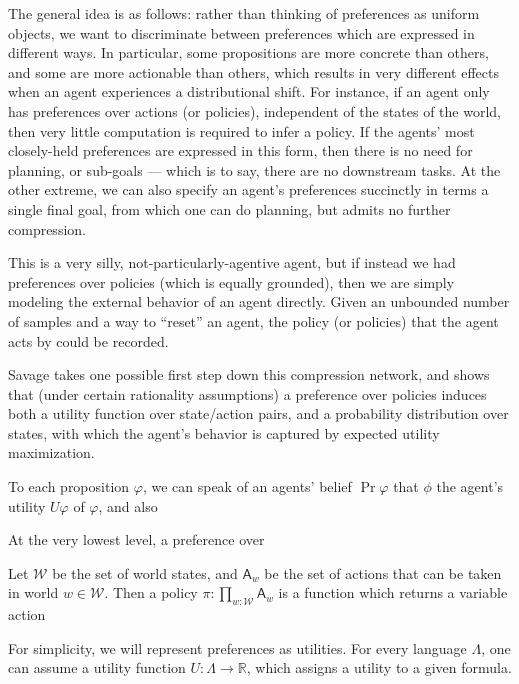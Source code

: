 \documentclass{book}
\begin{document}
	The general idea is as follows: rather than thinking of preferences as uniform objects, we want to discriminate between preferences which are expressed in different ways. In particular, some propositions are more concrete than others, and some are more actionable than others, which results in very different effects when an agent experiences a distributional shift. For instance, if an agent only has preferences over actions (or policies), independent of the states of the world, then very little computation is required to infer a policy. If the agents' most closely-held preferences are expressed in this form, then there is no need for planning, or sub-goals --- which is to say, there are no downstream tasks. At the other extreme, we can also specify an agent's preferences succinctly in terms a single final goal, from which one can do planning, but admits no further compression.
	
	
	
	This is a very silly, not-particularly-agentive agent, but if instead we had preferences over policies (which is equally grounded), then we are simply modeling the external behavior of an agent directly. Given an unbounded number of samples and a way to ``reset'' an agent, the policy (or policies) that the agent acts by could be recorded. 
	
	Savage takes one possible first step down this compression network, and shows that (under certain rationality assumptions) a preference over policies induces both a utility function over state/action pairs, and a probability distribution over states, with which the agent's behavior is captured by expected utility maximization.
	
	
	
	To each proposition $\varphi$, we can speak of an agents' belief $\Pr\varphi$ that $\phi$ the agent's utility $U \varphi$ of $\varphi$, and also 
	
 	At the very lowest level, a preference over 
	
	
	Let $\mathcal W$ be the set of world states, and $\mathsf A_w$ be the set of actions that can be taken in world $w \in \mathcal W$. Then a policy $\pi : \prod_{w: \mathcal W} \mathsf A_w$ is a function which returns a variable action
	

	
	
	For simplicity, we will represent preferences as utilities. For every language $\Lambda$, one can assume a utility function $U : \Lambda \to \mathbb R$, which assigns a utility to a given formula. 
	
\end{document}
